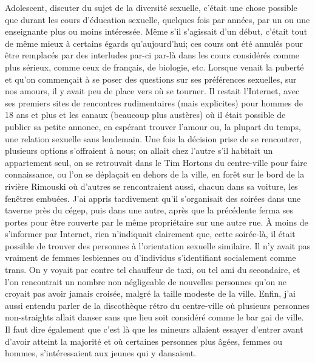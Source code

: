 Adolescent, discuter du sujet de la diversité sexuelle, c'était une chose possible que durant les cours d'éducation sexuelle, quelques fois par années, par un ou une enseignante plus ou moins intéressée.
Même s'il s'agissait d'un début, c'était tout de même mieux à certains égards qu'aujourd'hui; ces cours ont été annulés pour être remplacés par des interludes par-ci par-là dans les cours considérés comme plus sérieux, comme ceux de français, de biologie, etc.
Lorsque venait la puberté et qu'on commençait à se poser des questions sur ses préférences sexuelles, sur nos amours, il y avait peu de place vers où se tourner.
Il restait l'Internet, avec ses premiers sites de rencontres rudimentaires (mais explicites) pour hommes de 18 ans et plus et les canaux \irc{} (beaucoup plus austères) où il était possible de publier sa petite annonce, en espérant trouver l'amour ou, la plupart du temps, une relation sexuelle sans lendemain.
Une fois la décision prise de se rencontrer, plusieurs options s'offraient à nous; on allait chez l'autre s'il habitait un appartement seul, on se retrouvait dans le Tim Hortons du centre-ville pour faire connaissance, ou l'on se déplaçait en dehors de la ville, en forêt sur le bord de la rivière Rimouski où d'autres se rencontraient aussi, chacun dans sa voiture, les fenêtres embuées.
J'ai appris tardivement qu'il s'organisait des soirées dans une taverne près du cégep, puis dans une autre, après que la précédente ferma ses portes pour être rouverte par le même propriétaire sur une autre rue.
À moins de s'informer par Internet, rien n'indiquait clairement que, cette soirée-là, il était possible de trouver des personnes à l'orientation sexuelle similaire.
Il n'y avait pas vraiment de femmes lesbiennes ou d'individus s'identifiant socialement comme trans.
On y voyait par contre tel chauffeur de taxi, ou tel ami du secondaire, et l'on rencontrait un nombre non négligeable de nouvelles personnes qu'on ne croyait pas avoir jamais croisée, malgré la taille modeste de la ville.
Enfin, j'ai aussi entendu parler de la discothèque rétro du centre-ville où plusieurs personnes non-straights allait danser sans que lieu soit considéré comme le bar gai de ville.
Il faut dire également que c'est là que les mineurs allaient essayer d'entrer avant d'avoir atteint la majorité et où certaines personnes plus âgées, femmes ou hommes, s'intéressaient aux jeunes qui y dansaient.

